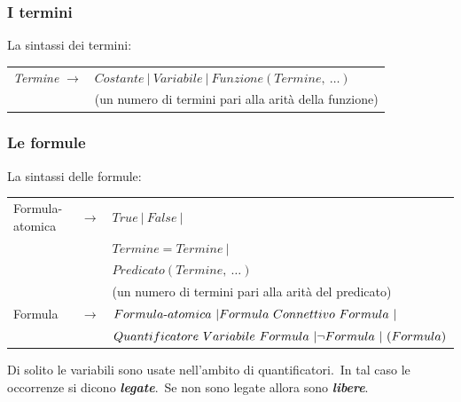 \subsubsection{I termini}

La sintassi dei termini:\
\begin{table}[H]
	\centering
	\begin{tabular}{l l}
		\textit{Termine} $\rightarrow$ & $Costante\ |\ Variabile\ |\ Funzione (Termine,\ \dots)$ \\
		                               & (un numero di termini pari alla arità della funzione)   \\
	\end{tabular}
\end{table}

\subsubsection{Le formule}

La sintassi delle formule:

\begin{table}[H]
	\centering
	\begin{tabular}{l l p{18em}}
		Formula-atomica & $\rightarrow$ & $ True\ |\ False\ |$                                                         \\
		                &               & $Termine = Termine\ |$                                                       \\
		                &               & $Predicato (Termine,\ \dots)$                                                \\
		                &               & (un numero di termini pari alla arità del predicato)                         \\
		Formula         & $\rightarrow$ & $Formula\textrm{-}atomica\ | \newline Formula\ Connettivo\ Formula\ |$       \\
		                &               & $Quantificatore\ Variabile\ Formula\ | \newline \lnot Formula\ |\ (Formula)$ \\
	\end{tabular}
\end{table}

\noindent Di solito le variabili sono usate nell'ambito di quantificatori.\ In tal caso le occorrenze si dicono \textbf{\textit{legate}}.\ Se non sono legate allora sono \textbf{\textit{libere}}.

